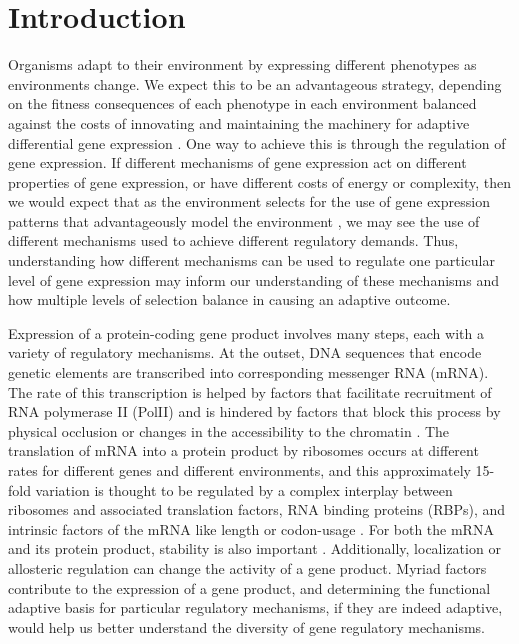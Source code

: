 \chapter{Introduction}

Organisms adapt to their environment 
by expressing different phenotypes 
as environments change. 
We expect this to be an advantageous strategy, 
depending on the fitness consequences of 
each phenotype in each environment 
balanced against the costs of innovating and maintaining
the machinery for adaptive differential gene expression
\parencite{kussell2005phenotypic}. 
One way to achieve this is through the regulation of gene expression.
If different mechanisms of gene expression act on different properties
of gene expression, or have different costs of energy or complexity, 
then we would expect that as the environment selects for the use of 
gene expression patterns that advantageously model the environment
\parencite{tagkopoulos2008predictive}, we may see the use of different
mechanisms used to achieve different regulatory demands.
Thus, understanding how different mechanisms can be used to
regulate one particular level of gene expression may inform our 
understanding of these mechanisms and how multiple levels of selection 
balance in causing an adaptive outcome.

Expression of a protein-coding gene
product involves many steps, 
each with a variety of regulatory mechanisms. At the outset, DNA sequences
that encode genetic elements are transcribed into corresponding 
messenger RNA (mRNA). The rate of this transcription is helped by
factors that facilitate recruitment of RNA polymerase II (PolII)
and is hindered by factors that block this process by physical
occlusion or changes in the accessibility to the chromatin 
\parencite{hahn2011transcriptional}. 
The translation of mRNA into a protein product by
ribosomes occurs at different rates for different genes and different
environments, and this approximately 15-fold variation 
\parencite{weinberg2016improved} is thought to be 
regulated by a complex interplay between ribosomes and
associated translation factors, RNA binding proteins (RBPs), and
intrinsic factors of the mRNA like length or codon-usage 
\parencite{dever2016mechanism}.
For both the mRNA and its protein product, stability is also
important \parencite{perez2013eukaryotic,mcmanus2015next}. 
Additionally, localization or allosteric regulation can change
the activity of a gene product. Myriad factors contribute to the
expression of a gene product, and determining the functional adaptive
basis for particular regulatory mechanisms, if they are indeed
adaptive, would help us better understand the diversity of gene
regulatory mechanisms.

